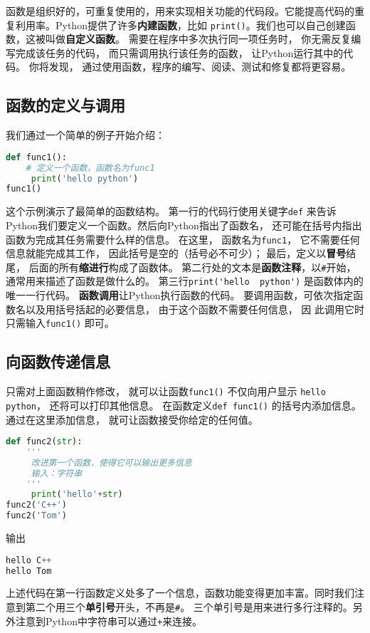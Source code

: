 

函数是组织好的，可重复使用的，用来实现相关功能的代码段。它能提高代码的重复利用率。Python提供了许多\textbf{内建函数}，比如 \verb|print()|。我们也可以自己创建函数，这被叫做\textbf{自定义函数}。 需要在程序中多次执行同一项任务时， 你无需反复编写完成该任务的代码， 而只需调用执行该任务的函数， 让Python运行其中的代码。 你将发现， 通过使用函数，程序的编写、阅读、测试和修复都将更容易。

\subsection{函数的定义与调用}
我们通过一个简单的例子开始介绍：
\begin{lstlisting}[language=python]
def func1():
    # 定义一个函数，函数名为func1
     print('hello python')
func1()
\end{lstlisting}
这个示例演示了最简单的函数结构。 第一行的代码行使用关键字\verb|def| 来告诉Python我们要定义一个函数。然后向Python指出了函数名， 还可能在括号内指出函数为完成其任务需要什么样的信息。 在这里， 函数名为\verb|func1|， 它不需要任何信息就能完成其工作， 因此括号是空的（括号必不可少）； 最后，定义以\textbf{冒号}结尾， 后面的所有\textbf{缩进行}构成了函数体。 第二行处的文本是\textbf{函数注释}，以\verb|#|开始，通常用来描述了函数是做什么的。
第三行\verb|print('hello  python')| 是函数体内的唯一一行代码。
\textbf{函数调用}让Python执行函数的代码。 要调用函数，可依次指定函数名以及用括号括起的必要信息， 由于这个函数不需要任何信息， 因
此调用它时只需输入\verb|func1()| 即可。

\subsection{向函数传递信息}
只需对上面函数稍作修改， 就可以让函数\verb|func1()| 不仅向用户显示 \verb|hello python|， 还将可以打印其他信息。 在函数定义\verb|def func1()| 的括号内添加信息。 通过在这里添加信息， 就可让函数接受你给定的任何值。
\begin{lstlisting}[language=python]
def func2(str):
    '''
     改进第一个函数，使得它可以输出更多信息
     输入：字符串
    '''
     print('hello'+str)
func2('C++')
func2('Tom')
\end{lstlisting}
输出
\begin{lstlisting}[language=python]
hello C++
hello Tom
\end{lstlisting}
上述代码在第一行函数定义处多了一个信息，函数功能变得更加丰富。同时我们注意到第二个用三个\textbf{单引号}开头，不再是\verb|#|。 三个单引号是用来进行多行注释的。另外注意到Python中字符串可以通过\verb|+|来连接。

